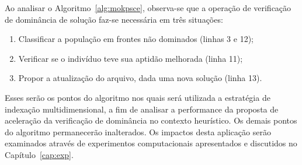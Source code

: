 Ao analisar o Algoritmo~\ref{alg:mokpsce}, observa-se que a operação
de verificação de dominância de solução faz-se necessária em três situações:
\begin{enumerate}[itemsep=-3pt, topsep=0pt, partopsep=0pt]
  \small
  \item{Classificar a população em frontes não dominados (linhas 3 e 12);}
  \item{Verificar se o indivíduo teve sua aptidão melhorada (linha 11);}
  \item{Propor a atualização do arquivo, dada uma nova solução (linha 13).}
\end{enumerate}
\noindent Esses serão os pontos do algoritmo nos quais será utilizada
a estratégia de indexação multidimensional, a fim de analisar
a performance da proposta de aceleração da verificação de dominância
no contexto heurístico.
Os demais pontos do algoritmo permanecerão inalterados.
Os impactos desta aplicação serão examinados através de experimentos
computacionais apresentados e discutidos no Capítulo~\ref{cap:exp}.
